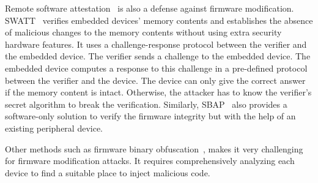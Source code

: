 Remote software attestation~\cite{li2011viper} is also a defense against firmware modification.  SWATT~\cite{seshadri2004swatt} verifies embedded devices' memory contents and establishes the absence of malicious changes to the memory contents without using extra security hardware features. It uses a challenge-response protocol between the
verifier and the embedded device. The verifier sends a challenge to the embedded device. The embedded device computes a response to this challenge in a pre-defined protocol between the verifier and the device. The device can only give the correct answer if the memory content is intact. Otherwise, the attacker has to know the verifier's secret algorithm to break the verification. Similarly, SBAP~\cite{li2010sbap} also provides a software-only solution to verify the firmware integrity but with the help of an existing peripheral device.

Other methods such as firmware binary obfuscation~\cite{cyr2019low, schrittwieser2016protecting, cheng2019dynopvm},  makes it very challenging for firmware modification attacks. It requires comprehensively analyzing each device to find a suitable place to inject malicious code.
